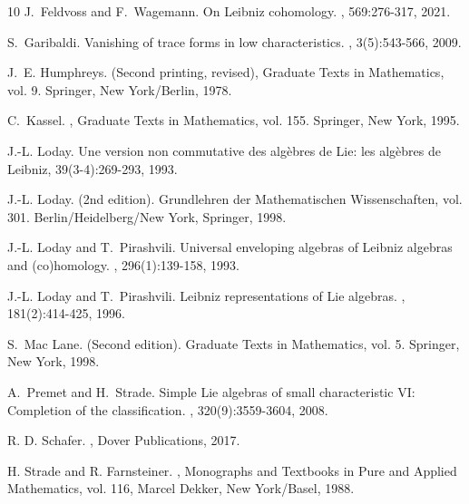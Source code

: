 \documentclass{jonasart}
\begin{document}
{\begin{thebibliography}{10}
        J.~Feldvoss and F.~Wagemann.
        \newblock On Leibniz cohomology.
        , 569:276-317, 2021.

        S.~Garibaldi.
        \newblock Vanishing of trace forms in low characteristics.
        , 3(5):543-566, 2009.

        J.~E. Humphreys.
         (Second printing, revised),
        \newblock Graduate Texts in Mathematics, vol. 9.
        \newblock Springer, New York/Berlin, 1978.

        C.~Kassel.
        ,
        \newblock Graduate Texts in Mathematics, vol. 155.
        \newblock Springer, New York, 1995.

        J.-L. Loday.
        \newblock Une version non commutative des alg\`ebres de Lie: les alg\`ebres de Leibniz,
         39(3-4):269-293, 1993.

        J.-L. Loday.
         (2nd edition).
        \newblock Grundlehren der Mathematischen Wissenschaften, vol. 301.
        \newblock Berlin/Heidelberg/New York, Springer, 1998.

        J.-L. Loday and T.~Pirashvili.
        \newblock Universal enveloping algebras of Leibniz algebras and (co)homology.
        , 296(1):139-158, 1993.

        J.-L. Loday and T.~Pirashvili.
        \newblock Leibniz representations of Lie algebras.
        , 181(2):414-425, 1996.

        S.~Mac Lane.
         (Second edition).
        \newblock Graduate Texts in Mathematics, vol. 5.
        \newblock Springer, New York, 1998.

        A.~Premet and H.~Strade.
        \newblock Simple Lie algebras of small characteristic VI: Completion of the classification.
        , 320(9):3559-3604, 2008.

        R. D. Schafer.
        ,
        \newblock Dover Publications, 2017.

        H. Strade and R. Farnsteiner.
        ,
        \newblock Monographs and Textbooks in Pure and Applied Mathematics, vol. 116,
        \newblock Marcel Dekker, New York/Basel, 1988.
    \end{thebibliography}
    }
\end{document}
